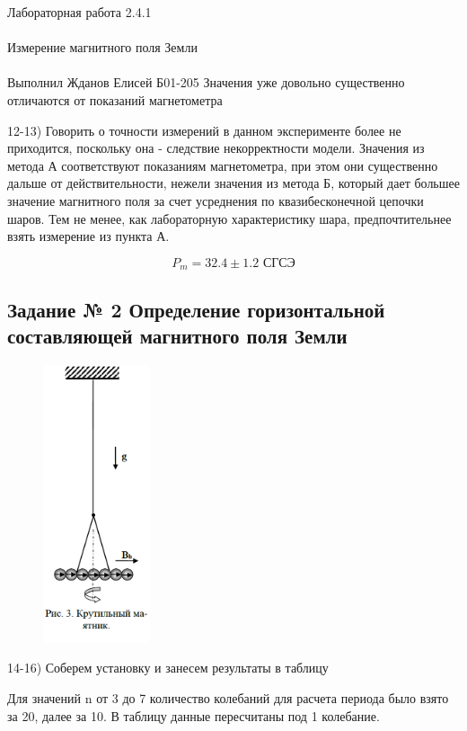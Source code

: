 \documentclass{astroedu-lab}
\begin{document}
\begin{problem}{\huge Лабораторная работа 2.4.1\\\\Измерение магнитного поля Земли\\\\Выполнил Жданов Елисей Б01-205}
Значения уже довольно существенно отличаются от показаний магнетометра

12-13) Говорить о точности измерений в данном эксперименте более не приходится, поскольку она - следствие некорректности модели. Значения из метода А соответствуют показаниям магнетометра, при этом они существенно дальше от действительности, нежели значения из метода Б, который дает большее значение магнитного поля за счет усреднения по квазибесконечной цепочки шаров. Тем не менее, как лабораторную характеристику шара, предпочтительнее взять измерение из пункта А.

\begin{equation}
	\boxed{P_m = 32.4 \pm 1.2 \text{ СГСЭ}}
\end{equation}

\newpage

\subsection{Задание № 2 Определение горизонтальной составляющей магнитного поля Земли}

\begin{figure}[!h]
	\centering
	\includegraphics[width=0.28\textwidth]{3.png}
	\label{fig:boiler}
\end{figure}

14-16) Соберем установку и занесем результаты в таблицу

Для значений n от 3 до 7 количество колебаний для расчета периода было взято за 20, далее за 10. В таблицу данные пересчитаны под 1 колебание.


\end{problem}
\end{document}
